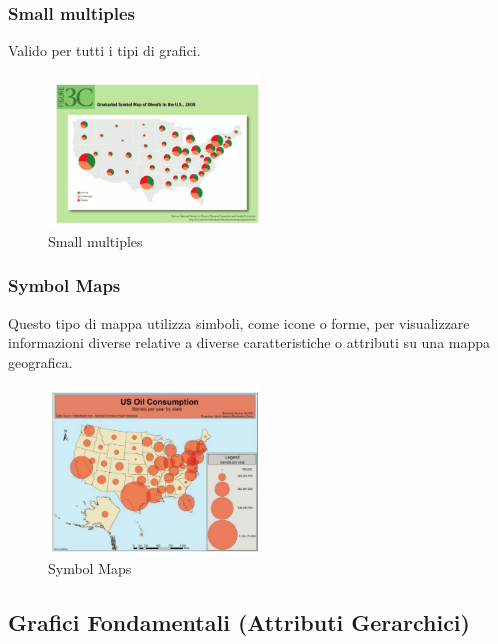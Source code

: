 \subsubsection{Small multiples}
Valido per tutti i tipi di grafici.
\begin{figure}[H]
    \centering
    \includegraphics[width=0.5\textwidth]{images/SmallMultiples2.png} %
    \caption{Small multiples}
    \label{fig:immagine}
\end{figure}
\subsubsection{Symbol Maps}
Questo tipo di mappa utilizza simboli, come icone o forme, per visualizzare informazioni diverse relative a diverse caratteristiche o 
attributi su una mappa geografica.
\begin{figure}[H]
    \centering
    \includegraphics[width=0.5\textwidth]{images/SymbolMaps.png} %
    \caption{Symbol Maps}
    \label{fig:immagine}
\end{figure}
\subsection{Grafici Fondamentali (Attributi Gerarchici)}
